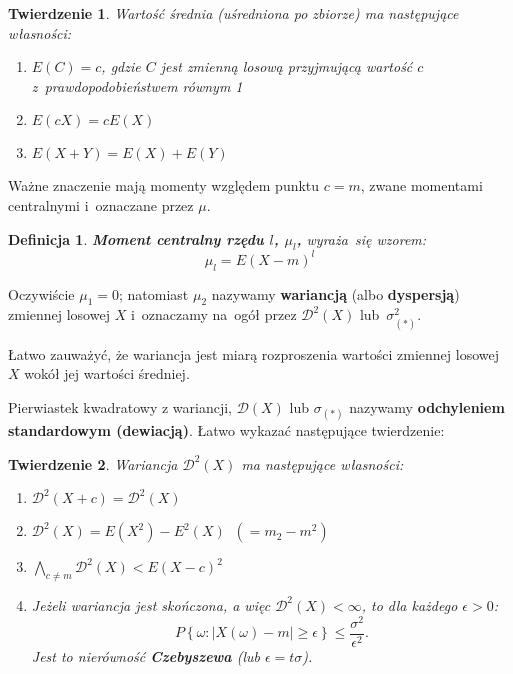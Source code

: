 \documentclass[10pt,a4paper]{article}
\newtheorem{definition}{Definicja}[section]
\newtheorem{theorem}{Twierdzenie}[section]
\numberwithin{equation}{subsection}
\begin{document}
\begin{theorem}
  Wartość średnia (uśredniona po zbiorze) ma następujące własności:
  \begin{enumerate}
    \item[a)] $E(C) = c$, gdzie $C$ jest zmienną losową przyjmującą wartość $c$
      z~prawdopodobieństwem równym 1
    \item[b)] $E(cX) = cE(X)$
    \item[c)] $E(X+Y) = E(X) + E(Y)$
  \end{enumerate}
\end{theorem}

Ważne znaczenie mają momenty względem punktu  $c=m$, zwane momentami centralnymi
i~oznaczane przez $\mu$.

\begin{definition}
  \textbf{Moment centralny rzędu $l$, $\mu_l$,} wyraża~się wzorem:
  \begin{equation}
    \mu_l = E(X-m)^l
  \end{equation}
\end{definition}

Oczywiście $\mu_1 = 0$; natomiast $\mu_2$ nazywamy \textbf{wariancją} (albo
\textbf{dyspersją}) zmiennej losowej $X$ i~oznaczamy na~ogół przez
$\mathscr{D}^2(X)$ lub~$\sigma_{(*)}^2$.

Łatwo zauważyć, że wariancja jest miarą rozproszenia wartości zmiennej
losowej $X$ wokół jej  wartości średniej.

Pierwiastek kwadratowy z wariancji, $\mathscr{D}(X)$ lub $\sigma_{(*)}$ nazywamy
\textbf{odchyleniem standardowym (dewiacją)}. Łatwo wykazać następujące
twierdzenie:

\begin{theorem}
  Wariancja $\mathscr{D}^2(X)$ ma następujące własności:
  \begin{enumerate}
    \item[a)] $\mathscr{D}^2(X+c) = \mathscr{D}^2{(X)}$
    \item[b)] $\mathscr{D}^2(X) = E(X^2) - E^2(X)\;\;(=m_2-m^2)$
    \item[c)] $\bigwedge_{c\neq m}\mathscr{D}^2(X)<E(X-c)^2$
    \item[d)] Jeżeli wariancja jest skończona, a więc $\mathscr{D}^2(X)<\infty$,
      to dla każdego $\epsilon > 0$:
      \[
        P\left\{\omega:|X(\omega)-m|\geq \epsilon\right\}\leq
        \frac{\sigma^2}{\epsilon^2}.
      \]
      Jest to nierówność \textbf{Czebyszewa} (lub $\epsilon = t\sigma$).
  \end{enumerate}
\end{theorem}
\end{document}
